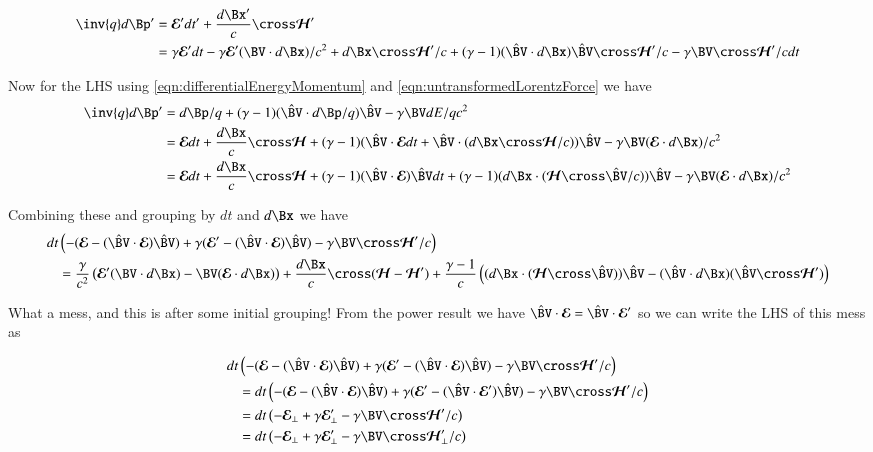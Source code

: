 \documentclass{article}
\newcommand{\EE}[0]{\boldsymbol{\mathcal{E}}}
\newcommand{\HH}[0]{\boldsymbol{\mathcal{H}}}
\newcommand{\Vcap}[0]{\hat{\BV}}
\begin{document}
\begin{align*}
\inv{q} d\Bp'
&= \EE' dt' + \frac{d\Bx'}{c} \cross \HH' \\
&= \gamma \EE' dt - \gamma \EE' (\BV \cdot d\Bx )/c^2 
+ d\Bx \cross \HH'/c + (\gamma-1)(\Vcap \cdot d\Bx) \Vcap \cross \HH'/c - \gamma \BV \cross \HH'/c dt \\
\end{align*}

Now for the LHS using \ref{eqn:differentialEnergyMomentum} and \ref{eqn:untransformedLorentzForce} we have
\begin{align*}
\inv{q} d\Bp'
&= d\Bp/q + (\gamma-1)(\Vcap \cdot d\Bp/q) \Vcap - \gamma \BV dE/qc^2 \\
&= \EE dt + \frac{d\Bx}{c} \cross \HH 
+ (\gamma-1)( \Vcap \cdot \EE dt + \Vcap \cdot (d\Bx \cross \HH/c) ) \Vcap - \gamma \BV (
\EE \cdot d\Bx
)/c^2 \\
&= \EE dt + \frac{d\Bx}{c} \cross \HH 
+ (\gamma-1) (\Vcap \cdot \EE) \Vcap dt
+ (\gamma-1)( d\Bx \cdot (\HH \cross \Vcap/c) ) \Vcap 
- \gamma \BV ( \EE \cdot d\Bx )/c^2 \\
\end{align*}

Combining these and grouping by $dt$ and $d\Bx$ we have
\begin{align*}
dt &\left(
-( \EE - (\Vcap \cdot \EE) \Vcap )
+ \gamma (\EE' - (\Vcap \cdot \EE) \Vcap )
- \gamma \BV \cross \HH'/c 
\right) \\
&= 
 \frac{\gamma}{c^2} \left( \EE' (\BV \cdot d\Bx ) - \BV ( \EE \cdot d\Bx ) \right)
+ \frac{d\Bx}{c} \cross (\HH -\HH') 
+ \frac{\gamma-1}{c}
\left(
( d\Bx \cdot (\HH \cross \Vcap) ) \Vcap - (\Vcap \cdot d\Bx) (\Vcap \cross \HH') 
\right) \\
\end{align*}

What a mess, and this is after some initial grouping!  From the power result we have $\Vcap \cdot \EE = \Vcap \cdot \EE'$ so we can write the LHS of this mess as

\begin{align*}
dt &\left(
-( \EE - (\Vcap \cdot \EE) \Vcap )
+ \gamma (\EE' - (\Vcap \cdot \EE) \Vcap )
- \gamma \BV \cross \HH'/c 
\right) \\
&=
dt \left(
-( \EE - (\Vcap \cdot \EE) \Vcap )
+ \gamma (\EE' - (\Vcap \cdot \EE') \Vcap )
- \gamma \BV \cross \HH'/c 
\right)
\\
&=
dt \left(
-\EE_\perp 
+ \gamma \EE_\perp' 
- \gamma \BV \cross \HH'/c 
\right)
\\
&=
dt \left(
-\EE_\perp 
+ \gamma \EE_\perp' 
- \gamma \BV \cross \HH_\perp'/c 
\right)
\\
\end{align*}
\end{document}
